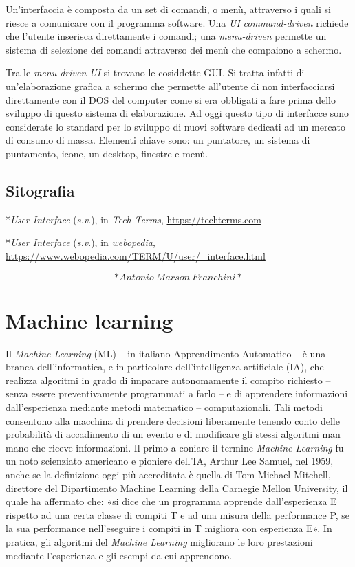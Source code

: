 \documentclass[
  b5paper,
  twoside,
  12pt,
  chapterprefix=false,
  bibliography=totocnumbered,
  parskip=false]{scrbook}
\begin{document}
Un'interfaccia è composta da un set di comandi, o menù, attraverso i
quali si riesce a comunicare con il programma software. Una \emph{UI}
\emph{command-driven} richiede che l'utente inserisca direttamente i comandi;
una \emph{menu-driven} permette un sistema di selezione dei comandi
attraverso dei menù che compaiono a schermo.

Tra le \emph{menu-driven UI} si trovano le cosiddette GUI. Si tratta infatti
di un'elaborazione grafica a schermo che permette all'utente di non
interfacciarsi direttamente con il DOS del computer come si era
obbligati a fare prima dello sviluppo di questo sistema di elaborazione.
Ad oggi questo tipo di interfacce sono considerate lo standard per lo
sviluppo di nuovi software dedicati ad un mercato di consumo di massa.
Elementi chiave sono: un puntatore, un sistema di puntamento, icone, un
desktop, finestre e menù.

\hypertarget{sitografia-19}{%
\section*{Sitografia}\label{sitografia-19}}

*\emph{User Interface} (\emph{s.v}.), in \emph{Tech} \emph{Terms},
\url{https://techterms.com}

*\emph{User Interface} (\emph{s.v}.), in \emph{webopedia},
\url{https://www.webopedia.com/TERM/U/user/_interface.html}

\[*Antonio~Marson~Franchini*\]

\hypertarget{machine-learning}{%
\chapter{Machine learning}\label{machine-learning}}

Il \emph{Machine Learning} (ML) -- in italiano Apprendimento Automatico -- è
una branca dell'informatica, e in particolare dell'intelligenza
artificiale (IA), che realizza algoritmi in grado di imparare
autonomamente il compito richiesto -- senza essere preventivamente
programmati a farlo -- e di apprendere informazioni dall'esperienza
mediante metodi matematico -- computazionali. Tali metodi consentono
alla macchina di prendere decisioni liberamente tenendo conto delle
probabilità di accadimento di un evento e di modificare gli stessi
algoritmi man mano che riceve informazioni. Il primo a coniare il
termine \emph{Machine Learning} fu un noto scienziato americano e pioniere
dell'IA, Arthur Lee Samuel, nel 1959, anche se la definizione oggi più
accreditata è quella di Tom Michael Mitchell, direttore del
Dipartimento Machine Learning della Carnegie Mellon University, il
quale ha affermato che: «si dice che un programma apprende
dall'esperienza E rispetto ad una certa classe di compiti T e ad una
misura della performance P, se la sua performance nell'eseguire i
compiti in T migliora con esperienza E». In pratica, gli algoritmi del
\emph{Machine Learning} migliorano le loro prestazioni mediante l'esperienza
e gli esempi da cui apprendono.~
\end{document}
